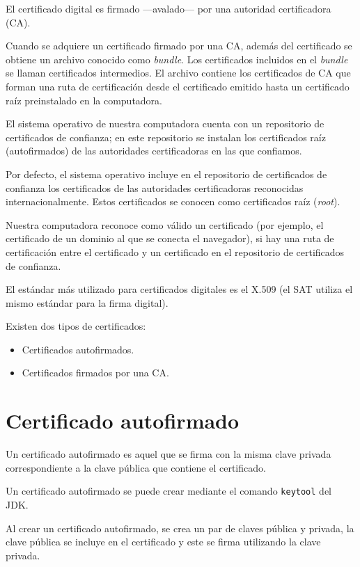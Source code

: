 El certificado digital es firmado —avalado— por una autoridad certificadora (CA).

Cuando se adquiere un certificado firmado por una CA, además del certificado se obtiene un archivo conocido como \emph{bundle}. Los certificados incluidos en el \emph{bundle} se llaman certificados intermedios. El archivo contiene los certificados de CA que forman una ruta de certificación desde el certificado emitido hasta un certificado raíz preinstalado en la computadora.

El sistema operativo de nuestra computadora cuenta con un repositorio de certificados de confianza; en este repositorio se instalan los certificados raíz (autofirmados) de las autoridades certificadoras en las que confiamos.

Por defecto, el sistema operativo incluye en el repositorio de certificados de confianza los certificados de las autoridades certificadoras reconocidas internacionalmente. Estos certificados se conocen como certificados raíz (\emph{root}).

Nuestra computadora reconoce como válido un certificado (por ejemplo, el certificado de un dominio al que se conecta el navegador), si hay una ruta de certificación entre el certificado y un certificado en el repositorio de certificados de confianza.

El estándar más utilizado para certificados digitales es el X.509 (el SAT utiliza el mismo estándar para la firma digital).

Existen dos tipos de certificados:

\begin{itemize}

\item Certificados autofirmados.

\item Certificados firmados por una CA.

\end{itemize}

\section{Certificado autofirmado}

Un certificado autofirmado es aquel que se firma con la misma clave privada correspondiente a la clave pública que contiene el certificado.

Un certificado autofirmado se puede crear mediante el comando \texttt{keytool} del JDK.

Al crear un certificado autofirmado, se crea un par de claves pública y privada, la clave pública se incluye en el certificado y este se firma utilizando la clave privada.

